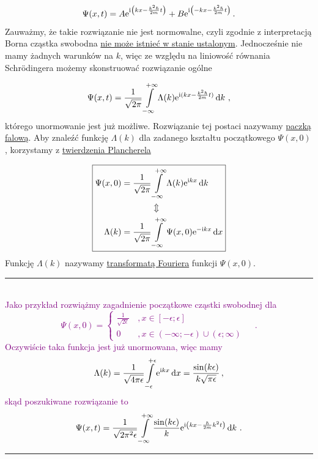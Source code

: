 \documentclass{myclass}
\begin{document}
\begin{equation*}
    \Psi(x,t)=A\mathrm{e}^{\mathrm{i}\left(kx-\frac{k^2\hbar}{2m} t\right)}+B\mathrm{e}^{\mathrm{i}\left(-kx-\frac{k^2\hbar}{2m} t\right)}\,.
\end{equation*}
Zauważmy, że takie rozwiązanie nie jest normowalne, czyli zgodnie z interpretacją Borna cząstka
swobodna \underline{nie może istnieć w stanie ustalonym}. Jednocześnie nie mamy żadnych warunków na
\(k\), więc ze względu na liniowość równania Schr{\"o}dingera możemy skonstruować rozwiązanie ogólne

\begin{equation*}
    \Psi(x,t)=\frac{1}{\sqrt{2\pi}}\int\limits_{-\infty}^{+\infty}\Lambda(k)\mathrm{e}^{\mathrm{i}(kx-\frac{k^2\hbar}{2m} t)}\dd{k}\,,
\end{equation*}
którego unormowanie jest już możliwe. Rozwiązanie tej postaci nazywamy \underline{paczką falową}.
Aby znaleźć funkcję \(\Lambda(k)\) dla zadanego kształtu początkowego \(\Psi(x,0)\), korzystamy z
\underline{twierdzenia Plancherela}

\begin{equation*}
\boxed{
\begin{split}
        \Psi(x,0)=\frac{1}{\sqrt{2\pi}}&\int\limits_{-\infty}^{+\infty}\Lambda(k)\mathrm{e}^{\mathrm{i} kx}\dd{k}\\
        &\Updownarrow\\
        \Lambda(k)=\frac{1}{\sqrt{2\pi}}&\int\limits_{-\infty}^{+\infty}\Psi(x,0)\mathrm{e}^{-\mathrm{i} kx}\dd{x}
\end{split}}
\end{equation*}
Funkcję \(\Lambda(k)\) nazywamy \underline{transformatą Fouriera} funkcji \(\Psi(x,0)\).\\
\noindent\rule{\columnwidth}{0.5pt}\\
\textcolor{purple}
{Jako przykład rozwiążmy zagadnienie początkowe cząstki swobodnej dla
\begin{equation*}
    \Psi(x,0)=\begin{cases}
    \frac{1}{\sqrt{2\epsilon}}&\,,x\in[-\epsilon;\epsilon]\\
    0&\,,x\in(-\infty;-\epsilon)\cup(\epsilon;\infty)
    \end{cases}\quad\,.
\end{equation*}
Oczywiście taka funkcja jest już unormowana, więc mamy
\begin{equation*}
    \Lambda(k)=\frac{1}{\sqrt{4\pi\epsilon}}\int\limits_{-\epsilon}^{+\epsilon}\mathrm{e}^{\mathrm{i} kx}\dd{x}=\frac{\sin(k\epsilon)}{k\sqrt{\pi\epsilon}}\,,
\end{equation*}
skąd poszukiwane rozwiązanie to
\begin{equation*}
    \Psi(x,t)=\frac{1}{\sqrt{2\pi^2\epsilon}}\int\limits_{-\infty}^{+\infty}\frac{\sin(k\epsilon)}{k}\mathrm{e}^{\mathrm{i}\left(kx-\frac{\hbar}{2m}k^2t\right)}\dd{k}\,.
\end{equation*}}
\noindent\rule{\columnwidth}{0.5pt}
\end{document}
